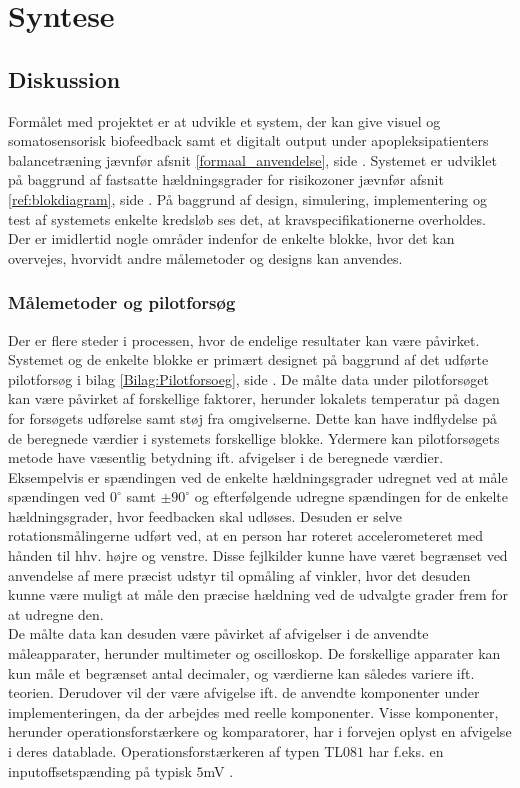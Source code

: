 \chapter{Syntese}
\section{Diskussion}
Formålet med projektet er at udvikle et system, der kan give visuel og somatosensorisk biofeedback samt et digitalt output under apopleksipatienters balancetræning jævnfør afsnit \ref{formaal_anvendelse}, side \pageref{formaal_anvendelse}. Systemet er udviklet på baggrund af fastsatte hældningsgrader for risikozoner jævnfør afsnit \ref{ref:blokdiagram}, side \pageref{ref:blokdiagram}. På baggrund af design, simulering, implementering og test af systemets enkelte kredsløb ses det, at kravspecifikationerne overholdes. Der er imidlertid nogle områder indenfor de enkelte blokke, hvor det kan overvejes, hvorvidt andre målemetoder og designs kan anvendes.

\subsection{Målemetoder og pilotforsøg}
Der er flere steder i processen, hvor de endelige resultater kan være  påvirket. Systemet og de enkelte blokke er primært designet på baggrund af det udførte pilotforsøg i bilag \ref{Bilag:Pilotforsoeg}, side \pageref{Bilag:Pilotforsoeg}. De målte data under pilotforsøget kan være påvirket af forskellige faktorer, herunder lokalets temperatur på dagen for forsøgets udførelse samt støj fra omgivelserne. Dette kan have indflydelse på de beregnede værdier i systemets forskellige blokke.
Ydermere kan pilotforsøgets metode have væsentlig betydning ift. afvigelser i de beregnede værdier. Eksempelvis er spændingen ved de enkelte hældningsgrader udregnet ved at måle spændingen ved $0^{\circ}$ samt $\pm90^{\circ}$ og efterfølgende udregne spændingen for de enkelte hældningsgrader, hvor feedbacken skal udløses. Desuden er selve rotationsmålingerne udført ved, at en person har roteret accelerometeret med hånden til hhv. højre og venstre. Disse fejlkilder kunne have været begrænset ved anvendelse af mere præcist udstyr til opmåling af vinkler, hvor det desuden kunne være muligt at måle den præcise hældning ved de udvalgte grader frem for at udregne den.  \\
De målte data kan desuden være påvirket af afvigelser i de anvendte måleapparater, herunder multimeter og oscilloskop. De forskellige apparater kan kun måle et begrænset antal decimaler, og værdierne kan således variere ift. teorien. Derudover vil der være afvigelse ift. de anvendte komponenter under implementeringen, da der arbejdes med reelle komponenter. Visse komponenter, herunder operationsforstærkere og komparatorer, har i forvejen oplyst en afvigelse i deres datablade. Operationsforstærkeren af typen TL$081$ har f.eks. en inputoffsetspænding på typisk $5$mV \cite{Corporation1995}.

